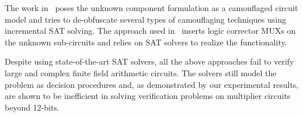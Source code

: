The work in~\cite{maciej:2017} poses the unknown component formulation
as a camouflaged circuit model and tries to de-obfuscate several types
of camouflaging techniques using incremental SAT solving. The approach
used in~\cite{andreas:2005} inserts logic corrector MUXs on the
unknown sub-circuits and relies on SAT solvers to realize the
functionality. 

Despite using state-of-the-art SAT solvers, all the above approaches
fail to verify large and complex finite field arithmetic circuits. The
solvers still model the problem as decision procedures and, as
demonstrated by our experimental results, are shown to be inefficient
in solving verification problems on multiplier circuits beyond
12-bits.  



